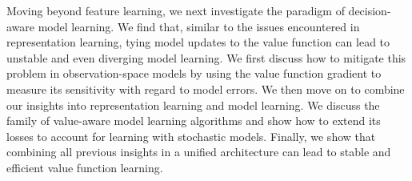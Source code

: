 Moving beyond feature learning, we next investigate the paradigm of decision-aware model learning.
We find that, similar to the issues encountered in representation learning, tying model updates to the value function can lead to unstable and even diverging model learning.
We first discuss how to mitigate this problem in observation-space models by using the value function gradient to measure its sensitivity with regard to model errors.
We then move on to combine our insights into representation learning and model learning.
We discuss the family of value-aware model learning algorithms and show how to extend its losses to account for learning with stochastic models.
Finally, we show that combining all previous insights in a unified architecture can lead to stable and efficient value function learning.